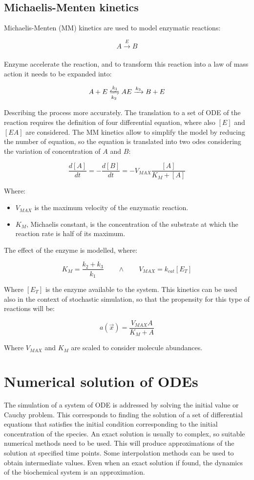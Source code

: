   \subsection{Michaelis-Menten kinetics}
  Michaelis-Menten (MM) kinetics are used to model enzymatic reactions:

  $$A\xrightarrow[]{E} B$$

  Enzyme accelerate the reaction, and to transform this reaction into a law of mass action it needs to be expanded into:

  $$A+E\xleftrightharpoons[k_2]{k_1} AE\xrightarrow[]{k_3} B+ E$$

  Describing the process more accurately.
  The translation to a set of ODE of the reaction requires the definition of four differential equation, where also $[E]$ and $[EA]$ are considered.
  The MM kinetics allow to simplify the model by reducing the number of equation, so the equation is translated into two odes considering the variation of concentration of $A$ and $B$:

  $$\frac{d[A]}{dt} = -\frac{d[B]}{dt} = -V_{MAX}\frac{[A]}{K_M + [A]}$$

  Where:

  \begin{multicols}{2}
    \begin{itemize}
      \item $V_{MAX}$ is the maximum velocity of the enzymatic reaction.
      \item $K_M$, Michaelis constant, is the concentration of the substrate at which the reaction rate is half of its maximum.
    \end{itemize}
  \end{multicols}

  The effect of the enzyme is modelled, where:

  $$K_M = \frac{k_2+k_3}{k_1}\qquad\land\qquad V_{MAX} = k_{cat}[E_T]$$

  Where $[E_T]$ is the enzyme available to the system.
  This kinetics can be used also in the context of stochastic simulation, so that the propensity for this type of reactions will be:

  $$a(\vec{x}) = \frac{V_{MAX}A}{K_M+A}$$

  Where $V_{MAX}$ and $K_M$ are scaled to consider molecule abundances.

\section{Numerical solution of ODEs}
The simulation of a system of ODE is addressed by solving the initial value or Cauchy problem.
This corresponds to finding the solution of a set of differential equations that satisfies the initial condition corresponding to the initial concentration of the species.
An exact solution is usually to complex, so suitable numerical methods need to be used.
This will produce approximations of the solution at specified time points.
Some interpolation methods can be used to obtain intermediate values.
Even when an exact solution if found, the dynamics of the biochemical system is an approximation.


